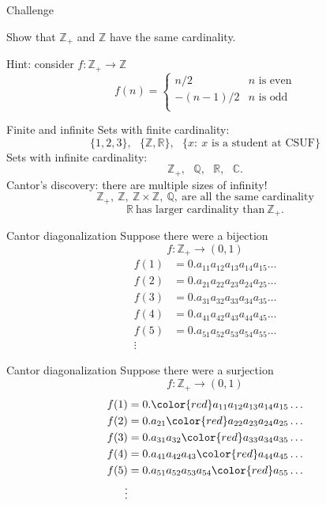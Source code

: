 \documentclass{beamer}
\begin{document}
\begin{frame}{Challenge}
\begin{prob}
Show that $\mathbb{Z}_+$ and $\mathbb{Z}$ have the same cardinality.
\end{prob}
\pause
Hint: consider $f: \mathbb{Z}_+\rightarrow\mathbb{Z}$
$$f(n) = \left\lbrace\begin{array}{cc}
n/2 & \text{$n$ is even}\\
-(n-1)/2 & \text{$n$ is odd}\\
\end{array}\right.$$
\end{frame}

\begin{frame}{Finite and infinite}
\pause
Sets with finite cardinality:
$$\{1,2,3\},\ \ \ \{\mathbb{Z},\mathbb{R}\},\ \ \ \{x:\ \text{$x$ is a student at CSUF}\}$$
\pause
Sets with infinite cardinality:
$$\mathbb{Z}_+,\ \ \ \mathbb{Q},\ \ \ \mathbb{R},\ \ \ \mathbb{C}.$$
\pause
Cantor's discovery: there are multiple sizes of infinity!
$$\mathbb{Z}_+,\ \mathbb{Z},\ \mathbb{Z}\times\mathbb{Z},\ \mathbb{Q},\ \text{are all the same cardinality}$$
\pause
$$\mathbb{R}\  \text{has larger cardinality than}\ \mathbb{Z}_+.$$
\end{frame}


\begin{frame}{Cantor diagonalization}
Suppose there were a bijection
$$f: \mathbb{Z}_+\rightarrow (0,1)$$
\pause
\begin{align*}
f(1) &= 0.a_{11}a_{12}a_{13}a_{14}a_{15}\dots\\
f(2) &= 0.a_{21}a_{22}a_{23}a_{24}a_{25}\dots\\
f(3) &= 0.a_{31}a_{32}a_{33}a_{34}a_{35}\dots\\
f(4) &= 0.a_{41}a_{42}a_{43}a_{44}a_{45}\dots\\
f(5) &= 0.a_{51}a_{52}a_{53}a_{54}a_{55}\dots\\
\vdots 
\end{align*}
\end{frame}

\begin{frame}{Cantor diagonalization}
Suppose there were a surjection
$$f: \mathbb{Z}_+\rightarrow (0,1)$$
\pause
\begin{align*}
f(1) &= 0.{\color{red} a_{11}}a_{12}a_{13}a_{14}a_{15}\dots\\
f(2) &= 0.a_{21}{\color{red} a_{22}}a_{23}a_{24}a_{25}\dots\\
f(3) &= 0.a_{31}a_{32}{\color{red} a_{33}}a_{34}a_{35}\dots\\
f(4) &= 0.a_{41}a_{42}a_{43}{\color{red} a_{44}}a_{45}\dots\\
f(5) &= 0.a_{51}a_{52}a_{53}a_{54}{\color{red} a_{55}}\dots\\
\vdots 
\end{align*}
\end{frame}
\end{document}
